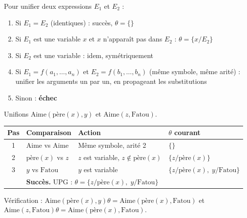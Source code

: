 \documentclass[11pt,a4paper]{article}
\newcommand{\cmark}{\ding{51}}
\begin{document}
\begin{recipebox}
Pour unifier deux expressions $E_1$ et $E_2$ :
\begin{enumerate}
    \item Si $E_1 = E_2$ (identiques) : succès, $\theta = \{\}$
    \item Si $E_1$ est une variable $x$ et $x$ n'apparaît pas dans $E_2$ : $\theta = \{x/E_2\}$
    \item Si $E_2$ est une variable : idem, symétriquement
    \item Si $E_1 = f(a_1, \ldots, a_n)$ et $E_2 = f(b_1, \ldots, b_n)$ (même symbole, même arité) : unifier les arguments un par un, en propageant les substitutions
    \item Sinon : \textbf{échec}
\end{enumerate}
\end{recipebox}

\begin{exemplebox}
Unifions $\text{Aime}(\text{père}(x), y)$ et $\text{Aime}(z, \text{Fatou})$.

\begin{center}
\begin{tabular}{clll}
\toprule
\textbf{Pas} & \textbf{Comparaison} & \textbf{Action} & \textbf{$\theta$ courant} \\
\midrule
1 & $\text{Aime}$ vs $\text{Aime}$ & Même symbole, arité 2 & $\{\}$ \\
2 & $\text{père}(x)$ vs $z$ & $z$ est variable, $z \notin \text{père}(x)$ & $\{z/\text{père}(x)\}$ \\
3 & $y$ vs $\text{Fatou}$ & $y$ est variable & $\{z/\text{père}(x), \; y/\text{Fatou}\}$ \\
\midrule
& \multicolumn{3}{l}{\textbf{Succès.} UPG : $\theta = \{z/\text{père}(x), \; y/\text{Fatou}\}$} \\
\bottomrule
\end{tabular}
\end{center}

Vérification : $\text{Aime}(\text{père}(x), y)\theta = \text{Aime}(\text{père}(x), \text{Fatou})$ et $\text{Aime}(z, \text{Fatou})\theta = \text{Aime}(\text{père}(x), \text{Fatou})$. \cmark
\end{exemplebox}
\end{document}
